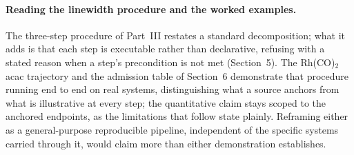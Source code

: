 \paragraph{Reading the linewidth procedure and the worked examples.} The
three-step procedure of Part~III restates a standard decomposition; what it
adds is that each step is executable rather than declarative, refusing with a
stated reason when a step's precondition is not met (Section~5). The Rh(CO)\(_2\)acac
trajectory and the admission table of Section~6 demonstrate that procedure
running end to end on real systems, distinguishing what a source anchors from
what is illustrative at every step; the quantitative claim stays scoped to
the anchored endpoints, as the limitations that follow state plainly. Reframing either as a
general-purpose reproducible pipeline, independent of the specific systems
carried through it, would claim more than either demonstration establishes.
